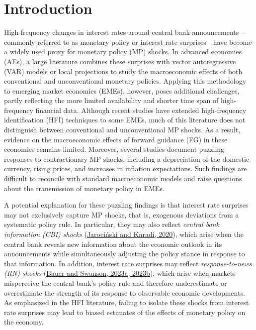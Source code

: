 \documentclass[\latexroot/\projectname]{subfiles}
\begin{document}
\section{Introduction}
\whenintegrated{\label{sec:intro}} %

\setcounter{page}{1}

High-frequency changes in interest rates around central bank announcements—commonly referred to as monetary policy or interest rate surprises—have become a widely used proxy for monetary policy (MP) shocks. In advanced economies (AEs), a large literature combines these surprises with vector autoregressive (VAR) models or local projections to study the macroeconomic effects of both conventional and unconventional monetary policies. Applying this methodology to emerging market economies (EMEs), however, poses additional challenges, partly reflecting the more limited availability and shorter time span of high-frequency financial data. Although recent studies have extended high-frequency identification (HFI) techniques to some EMEs, much of this literature does not distinguish between conventional and unconventional MP shocks. As a result, evidence on the macroeconomic effects of forward guidance (FG) in these economies remains limited. Moreover, several studies document puzzling responses to contractionary MP shocks, including a depreciation of the domestic currency, rising prices, and increases in inflation expectations. Such findings are difficult to reconcile with standard macroeconomic models and raise questions about the transmission of monetary policy in EMEs.


A potential explanation for these puzzling findings is that interest rate surprises may not exclusively capture MP shocks, that is, exogenous deviations from a systematic policy rule. In particular, they may also reflect \emph{central bank information (CBI) shocks} (\hyperlink{JK (2020)}{Jarociński and Karadi, 2020}), which arise when the central bank reveals new information about the economic outlook in its announcements while simultaneously adjusting the policy stance in response to that information. In addition, interest rate surprises may reflect \emph{response-to-news (RN) shocks} (\hyperlink{Bauer and Swanson (2023a)}{Bauer and Swanson, 2023a, 2023b}), which arise when markets misperceive the central bank's policy rule and therefore underestimate or overestimate the strength of its response to observable economic developments. As emphasized in the HFI literature, failing to isolate these shocks from interest rate surprises  may lead to biased estimates of the effects of monetary policy on the economy.
\end{document}
